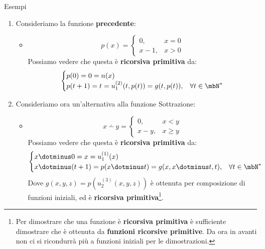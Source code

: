 \begin{generalbox}[colframe=azure-gradient-3!90!black]{Esempi}
\begin{enumerate}
\begin{itemize}
\begin{equation}
        \begin{cases}
          0! =1=s(0)\\
          (t+1)! =(t+1)\cdot t! =m(t+1, t!)=g(t+1,t!), & \forall t \in \mbN^*
        \end{cases}
      \end{equation}
    \end{itemize}
    \item Consideriamo la funzione \textbf{precedente}:
    \begin{itemize}
     \item []
     \begin{equation}
        p(x)=\begin{cases}
              0, &  x=0\\
              x-1, & x>0
            \end{cases}
      \end{equation}
      Possiamo vedere che questa è \textbf{ricorsiva primitiva} da:
      \begin{equation}
        \begin{cases}
          p(0)=0=n(x)\\
          p(t+1)=t=u_1^{(2)}(t,p(t))=g(t, p(t)), & \forall t \in \mbN^*
        \end{cases}
      \end{equation}
    \end{itemize}
    \item Consideriamo ora un'alternativa alla funzione Sottrazione:
    \begin{itemize}
     \item []
      \begin{equation}
        x\dotminus y =  \begin{cases}
                          0, & x<y \\
                          x-y, & x\geq y
                        \end{cases}
      \end{equation}
      Possiamo vedere che questa è \textbf{ricorsiva primitiva} da:
      \begin{equation}
        \begin{cases}
          x\dotminus 0=x=u_1^{(1)}(x)\\
          x\dotminus (t+1)=p(x\dotminus t)=g(x, x\dotminus t,t), & \forall t \in \mbN^*
        \end{cases}
      \end{equation}
      Dove \(g(x,y,z)=p(u_2^{(3)}(x,y,z))\) è ottenuta per composizione di funzioni iniziali, ed è \textbf{ricorsiva primitiva}\footnote{Per dimostrare che una funzione è \textbf{ricorsiva primitiva} è sufficiente dimostrare che è ottenuta da \textbf{funzioni ricorsive primitive}. Da ora in avanti non ci si ricondurrà più a funzioni iniziali per le dimostrazioni.}.

\end{itemize}
\end{enumerate}
\end{generalbox}
